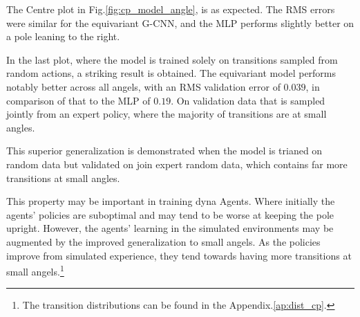 The Centre plot in Fig.\ref{fig:cp_model_angle}, is as expected. The RMS errors were similar for the equivariant G-CNN, and the MLP performs slightly better on a pole leaning to the right.

In the last plot, where the model is trained solely on transitions sampled from random actions, a striking result is obtained. The equivariant model performs notably better across all angels, with an RMS validation error of $0.039$, in comparison of that to the MLP of $0.19$. On validation data that is sampled jointly from an expert policy, where the majority of transitions are at small angles.

This superior generalization is demonstrated when the model is trianed on random data but validated on join expert random data, which contains far more transitions at small angles.

This property may be important in training dyna Agents. Where initially the agents' policies are suboptimal and may tend to be worse at keeping the pole upright. However, the agents' learning in the simulated environments may be augmented by the improved generalization to small angels. As the policies improve from simulated experience, they tend towards having more transitions at small angels.\footnote{The transition distributions can be found in the Appendix.\ref{ap:dist_cp}.}

